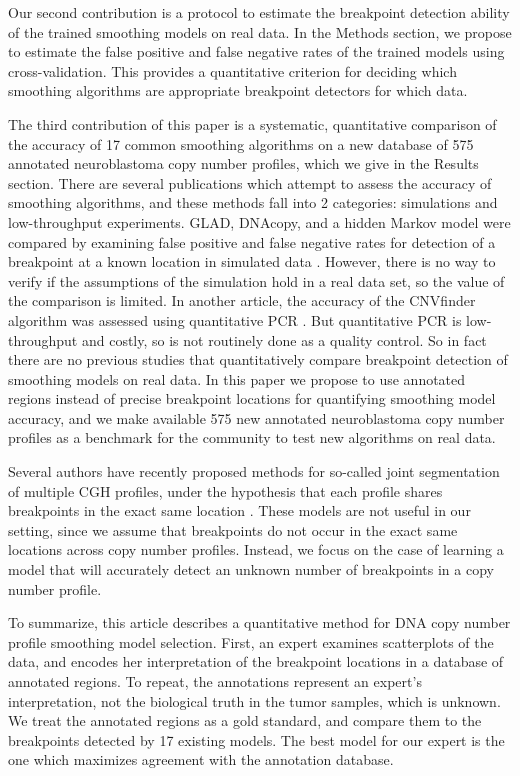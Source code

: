 \documentclass[10pt]{bmc_article}
\newcommand{\citep}[1]{\cite{#1}}
\newcommand{\model}[1]{#1}
\newenvironment{bmcformat}{\begin{raggedright}\baselineskip20pt\sloppy\setboolean{publ}{false}}{\end{raggedright}\baselineskip20pt\sloppy}
\begin{document}
\begin{bmcformat}
Our second contribution is a protocol to estimate the breakpoint
detection ability of the trained smoothing models on real data. In the
Methods section, we propose to estimate the false positive and false
negative rates of the trained models using cross-validation. This
provides a quantitative criterion for deciding which smoothing
algorithms are appropriate breakpoint detectors for which data.

The third contribution of this paper is a systematic, quantitative
comparison of the accuracy of 17 common smoothing algorithms on a
new database of 575 annotated neuroblastoma copy number profiles,
which we give in the Results section. There are several publications
which attempt to assess the accuracy of smoothing algorithms, and
these methods fall into 2 categories: simulations and low-throughput
experiments. GLAD, DNAcopy, and a hidden Markov model were compared by
examining false positive and false negative rates for detection of a
breakpoint at a known location in simulated data
\cite{compare}. However, there is no way to verify if the assumptions
of the simulation hold in a real data set, so the value of the
comparison is limited. In another article, the accuracy of the
\model{CNVfinder} algorithm was assessed using quantitative PCR
\cite{cnvfinder}. But quantitative PCR is low-throughput and costly,
so is not routinely done as a quality control. So in fact there are no
previous studies that quantitatively compare breakpoint detection of
smoothing models on real data. In this paper we propose to use
annotated regions instead of precise breakpoint locations for
quantifying smoothing model accuracy, and we make available 575 new
annotated neuroblastoma copy number profiles as a benchmark for the
community to test new algorithms on real data.

Several authors have recently proposed methods for so-called joint
segmentation of multiple CGH profiles, under the hypothesis that each
profile shares breakpoints in the exact same location
\citep{jp-nips,nbc}. These models are not useful in our
setting, since we assume that breakpoints do not occur in the exact
same locations across copy number profiles. Instead, we focus on the
case of learning a model that will accurately detect an unknown number
of breakpoints in a copy number profile.

To summarize, this article describes a quantitative method for DNA
copy number profile smoothing model selection. First, an expert
examines scatterplots of the data, and encodes her interpretation of
the breakpoint locations in a database of annotated regions. To
repeat, the annotations represent an expert's interpretation, not the
biological truth in the tumor samples, which is unknown. We treat the
annotated regions as a gold standard, and compare them to the
breakpoints detected by 17 existing models. The best model for our
expert is the one which maximizes agreement with the annotation
database.



\end{bmcformat}
\end{document}
